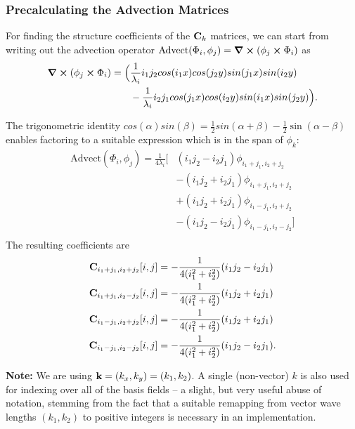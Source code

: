 \subsubsection*{Precalculating the Advection Matrices}
For finding the structure coefficients of the $\vb{C}_k$ matrices, we can start
from writing out the advection operator $\text{Advect}(\Phi_i, \phi_j)
= \curl(\phi_j \cross \Phi_i)$ as
\begin{align*}
\curl(\phi_j \cross \Phi_i) = \Big(
    &\frac{1}{\lambda_i}i_1j_2cos(i_1x)cos(j_2y)sin(j_1x)sin(i_2y)\\
    &-\frac{1}{\lambda_i}i_2j_1cos(j_1x)cos(i_2y)sin(i_1x)sin(j_2y)
\Big).
\end{align*}


The trigonometric identity $cos(\alpha)sin(\beta)
= \frac{1}{2}sin(\alpha+\beta)-\frac{1}{2}\sin(\alpha-\beta)$ enables factoring
to a suitable expression which is in the span of ${\phi_k}$:
\begin{align*}
\text{Advect}(\Phi_i,\phi_j)= \frac{1}{4\lambda_{i}}
    \Big[&(i_1 j_2 - i_2 j_1)\phi_{i_1+j_1, i_2+j_2}\\
     &-(i_1 j_2 + i_2 j_1)\phi_{i_1+j_1, i_2+j_2}\\
     &+(i_1 j_2 + i_2 j_1)\phi_{i_1-j_1, i_2+j_2}\\
     &-(i_1 j_2 - i_2 j_1)\phi_{i_1-j_1, i_2-j_2}\Big]\\
\end{align*}
The resulting coefficients are
\begin{align*}
    \vb{C}_{i_1+j_1,i_2+j_2}[i,j] &= -\frac{1}{4(i_1^2 + i_2^2)}(i_1j_2-i_2j_1)\\
    \vb{C}_{i_1+j_1,i_2-j_2}[i,j] &= -\frac{1}{4(i_1^2 + i_2^2)}(i_1j_2+i_2j_1)\\
    \vb{C}_{i_1-j_1,i_2+j_2}[i,j] &= -\frac{1}{4(i_1^2 + i_2^2)}(i_1j_2+i_2j_1)\\
    \vb{C}_{i_1-j_1,i_2-j_2}[i,j] &= -\frac{1}{4(i_1^2 + i_2^2)}(i_1j_2-i_2j_1).\\
\end{align*}

\textbf{Note:} We are using $\vb{k} = (k_x, k_y) = (k_1, k_2)$. A single
(non-vector) $k$ is also used for indexing over all of the basis fields --
a slight, but very useful abuse of notation, stemming from the fact that
a suitable remapping from vector wave lengths $(k_1, k_2)$ to positive integers
is necessary in an implementation.




















